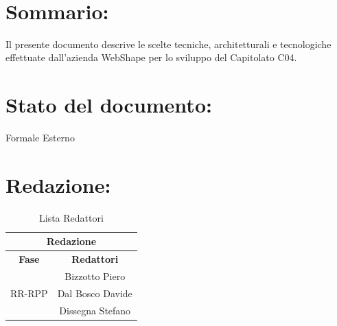 \newpage

\begin{center} %
	\begin{Huge}	
				\textbf{\TITOLODOC}
			\\
	\end{Huge}
\end{center}

\section*{\LARGE Sommario:}
Il presente documento descrive le scelte tecniche, architetturali e tecnologiche effettuate dall'azienda WebShape per lo sviluppo del Capitolato C04.

\indent \indent

\section*{\LARGE Stato del documento:}
\indent \indent
	Formale Esterno

\section*{\LARGE Redazione:}
	\begin{table}[!h]
		\begin{center}
			\begin{tabular}
				{|c|c|}
				\hline
				\multicolumn{2}{|c|}{ \textbf{Redazione} } \\
				\hline
				\textbf{Fase} & \textbf{Redattori} \\
				\hline
				\multirow{3}{*}{RR-RPP} & Bizzotto Piero\\
										& Dal Bosco Davide\\
										& Dissegna Stefano\\
				\hline
			\end{tabular}
			\caption{Lista Redattori} %
			\label{tabredazione}
		\end{center}
	\end{table}

